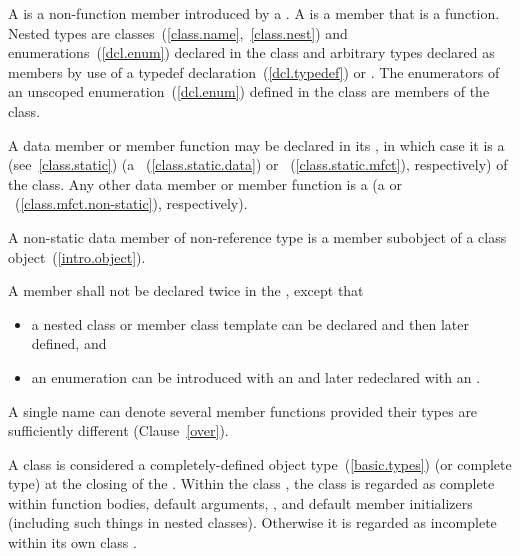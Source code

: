 \pnum
A  is a non-function member introduced by a
.
A  is a member that is a function.
Nested types are classes~(\ref{class.name},~\ref{class.nest}) and
enumerations~(\ref{dcl.enum}) declared in the class and arbitrary types
declared as members by use of a typedef declaration~(\ref{dcl.typedef})
or .
The enumerators of an unscoped enumeration~(\ref{dcl.enum}) defined in the class
are members of the class.

%
%
%
\pnum
A data member or member function
may be declared  in its ,
in which case it is a  (see~\ref{class.static})
(a ~(\ref{class.static.data}) or
~(\ref{class.static.mfct}), respectively)
of the class.
Any other data member or member function is a 
(a  or
~(\ref{class.mfct.non-static}), respectively).
\begin{note} A non-static data member of non-reference
type is a member subobject of a class object~(\ref{intro.object}).\end{note}

\pnum
A member shall not be declared twice in the
, except that
\begin{itemize}
\item a nested class or member
class template can be declared and then later defined, and
\item an
enumeration can be introduced with an  and later
redeclared with an .
\end{itemize}
\begin{note}
A single name can denote several member functions provided their types
are sufficiently different (Clause~\ref{over}).
\end{note}

\pnum
{}%
A class is considered a completely-defined object
type~(\ref{basic.types}) (or complete type) at the closing \tcode{\}} of
the .
Within the class
, the class is regarded as complete
within function bodies, default arguments,
, and
default member initializers
(including such things in nested classes).
Otherwise it is regarded as incomplete within its own class
.

